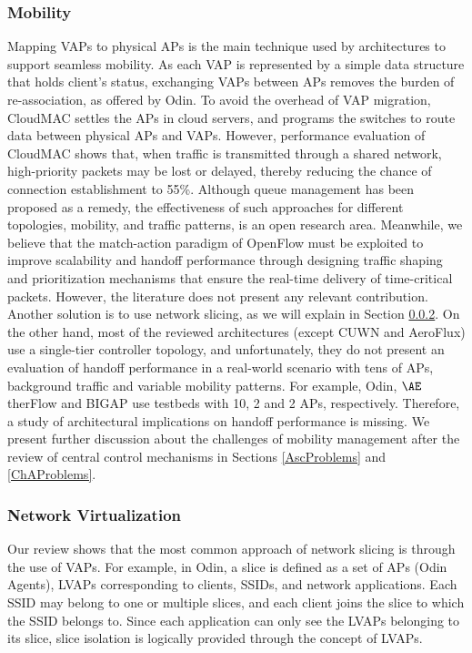 \subsubsection{\textbf{Mobility}}
\label{seam_mobility}
Mapping VAPs to physical APs is the main technique used by architectures to support seamless mobility.
As each VAP is represented by a simple data structure that holds client's status, exchanging VAPs between APs removes the burden of re-association, as offered by Odin.
To avoid the overhead of VAP migration, CloudMAC settles the APs in cloud servers, and programs the switches to route data between physical APs and VAPs.
However, performance evaluation of CloudMAC shows that, when traffic  is  transmitted  through  a  shared network, high-priority packets may be lost or delayed, thereby reducing the chance of connection establishment to 55\%.
Although queue management has been proposed as a remedy, the effectiveness of such approaches for different topologies, mobility, and traffic patterns, is an open research area.
Meanwhile, we believe that the match-action paradigm of OpenFlow must be exploited to improve scalability and handoff performance through designing traffic shaping and prioritization mechanisms that ensure the real-time delivery of time-critical packets.
However, the literature does not present any relevant contribution.
Another solution is to use network slicing, as we will explain in Section \ref{net_vir_dis}.
On the other hand, most of the reviewed architectures (except CUWN and AeroFlux) use a single-tier controller topology, and unfortunately, they do not present an evaluation of handoff performance in a real-world scenario with tens of APs, background traffic and variable mobility patterns.
For example, Odin, 	$\AE$therFlow and BIGAP use testbeds with 10, 2 and 2 APs, respectively.
Therefore, a study of architectural implications on handoff performance is missing.
We present further discussion about the challenges of mobility management after the review of central control mechanisms in Sections \ref{AscProblems} and \ref{ChAProblems}.



\subsubsection{\textbf{Network Virtualization}}
\label{net_vir_dis}
Our review shows that the most common approach of network slicing is through the use of VAPs.
For example, in Odin, a slice is defined as a set of APs (Odin Agents), LVAPs corresponding to clients, SSIDs, and network applications.
Each SSID may belong to one or multiple slices, and each client joins the slice to which the SSID belongs to.
Since each application can only see the LVAPs belonging to its slice, slice isolation is logically provided through the concept of LVAPs.

